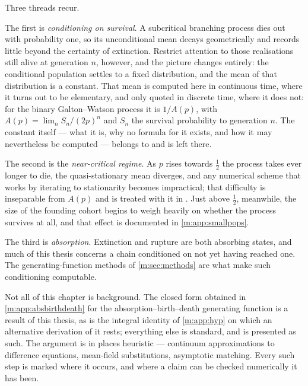 Three threads recur.

The first is \emph{conditioning on survival}. A subcritical branching process dies
out with probability one, so its unconditional mean decays geometrically and
records little beyond the certainty of extinction. Restrict attention to those
realisations still alive at generation $n$, however, and the picture changes
entirely: the conditional population settles to a fixed distribution, and the mean
of that distribution is a constant. That mean is computed here in continuous time,
where it turns out to be elementary, and only quoted in discrete time, where it
does not: for the binary Galton--Watson process it is $1/A(p)$, with
$A(p)=\lim_nS_n/(2p)^n$ and $S_n$ the survival probability to generation $n$. The
constant itself --- what it is, why no formula for it exists, and how it may
nevertheless be computed --- belongs to \ChA{} and is left there.

The second is the \emph{near-critical regime}. As $p$ rises towards $\tfrac12$ the
process takes ever longer to die, the quasi-stationary mean diverges, and any
numerical scheme that works by iterating to stationarity becomes impractical; that
difficulty is inseparable from $A(p)$ and is treated with it in \ChA. Just above
$\tfrac12$, meanwhile, the size of the founding cohort begins to weigh heavily on
whether the process survives at all, and that effect is documented in
\cref{m:app:smallpops}.

The third is \emph{absorption}. Extinction and rupture are both absorbing states,
and much of this thesis concerns a chain conditioned on not yet having reached one.
The generating-function methods of \cref{m:sec:methods} are what make such
conditioning computable.

Not all of this chapter is background. The closed form obtained in
\cref{m:app:absbirthdeath} for the absorption--birth--death generating function is
a result of this thesis, as is the integral identity of \cref{m:app:hyp} on which an
alternative derivation of it rests; everything else is standard, and is presented as
such. The argument is in places heuristic --- continuum approximations to difference
equations, mean-field substitutions, asymptotic matching. Every such step is marked
where it occurs, and where a claim can be checked numerically it has been.
